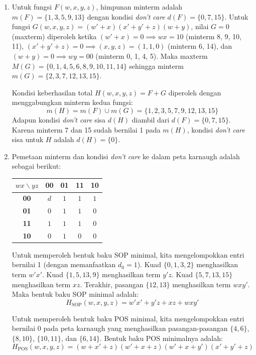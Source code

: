 \documentclass[12pt,a4paper]{article}
\begin{document}
\begin{enumerate}[label=(\alph*)]
    \item Untuk fungsi $F(w,x,y,z)$, himpunan minterm adalah $m(F) = \{1, 3, 5, 9, 13\}$ dengan kondisi \textit{don't care} $d(F) = \{0, 7, 15\}$. Untuk fungsi $G(w,x,y,z) = (w' + x)(x' + y' + z)(w + y)$, nilai $G=0$ (maxterm) diperoleh ketika $(w'+x)=0 \implies wx=10$ (minterm 8, 9, 10, 11), $(x'+y'+z)=0 \implies (x,y,z)=(1,1,0)$ (minterm 6, 14), dan $(w+y)=0 \implies wy=00$ (minterm 0, 1, 4, 5). Maka maxterm $M(G) = \{0, 1, 4, 5, 6, 8, 9, 10, 11, 14\}$ sehingga minterm $m(G) = \{2, 3, 7, 12, 13, 15\}$.
    
    Kondisi keberhasilan total $H(w,x,y,z) = F + G$ diperoleh dengan menggabungkan minterm kedua fungsi:
    \[ m(H) = m(F) \cup m(G) = \{1, 2, 3, 5, 7, 9, 12, 13, 15\} \]
    Adapun kondisi \textit{don't care} sisa $d(H)$ diambil dari $d(F) = \{0, 7, 15\}$. Karena minterm 7 dan 15 sudah bernilai 1 pada $m(H)$, kondisi \textit{don't care} sisa untuk $H$ adalah $d(H) = \{0\}$.

    \item Pemetaan minterm dan kondisi \textit{don't care} ke dalam peta karnaugh adalah sebagai berikut:
    \begin{center}
    \begin{tabular}{|c|c|c|c|c|}
    \hline
    $wx \backslash yz$ & \textbf{00} & \textbf{01} & \textbf{11} & \textbf{10} \\ \hline
    \textbf{00} & $d$ & $1$ & $1$ & $1$ \\ \hline
    \textbf{01} & $0$ & $1$ & $1$ & $0$ \\ \hline
    \textbf{11} & $1$ & $1$ & $1$ & $0$ \\ \hline
    \textbf{10} & $0$ & $1$ & $0$ & $0$ \\ \hline
    \end{tabular}
    \end{center}
    
    Untuk memperoleh bentuk baku SOP minimal, kita mengelompokkan entri bernilai 1 (dengan memanfaatkan $d_0 = 1$). Kuad $\{0, 1, 3, 2\}$ menghasilkan term $w'x'$. Kuad $\{1, 5, 13, 9\}$ menghasilkan term $y'z$. Kuad $\{5, 7, 13, 15\}$ menghasilkan term $xz$. Terakhir, pasangan $\{12, 13\}$ menghasilkan term $wxy'$. Maka bentuk baku SOP minimal adalah:
    \[ \boxed{H_{\text{SOP}}(w,x,y,z) = w'x' + y'z + xz + wxy'} \]

    Untuk memperoleh bentuk baku POS minimal, kita mengelompokkan entri bernilai 0 pada peta karnaugh yang menghasilkan pasangan-pasangan $\{4, 6\}$, $\{8, 10\}$, $\{10, 11\}$, dan $\{6, 14\}$. Bentuk baku POS minimalnya adalah:
    \[ \boxed{H_{\text{POS}}(w,x,y,z) = (w + x' + z)(w' + x + z)(w' + x + y')(x' + y' + z)} \]


\end{enumerate}
\end{document}
